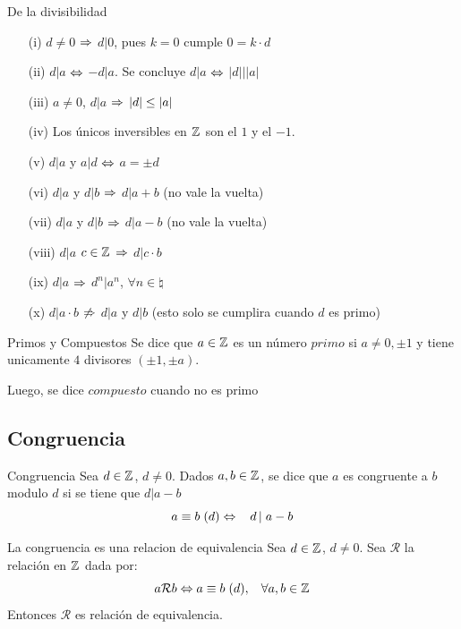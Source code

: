 \documentclass[10pt]{article}
\begin{document}
\begin{prop}{De la divisibilidad} 
\begin{itemize}
 \item[   (i)] $d \neq 0$ $\Rightarrow$ $d | 0$, pues $k = 0$ cumple $0 = k \cdot d$
 \item[  (ii)] $d | a$ $\Leftrightarrow$ $- d | a$. Se concluye $d | a$ $\Leftrightarrow$ 
 $|d| \left\vert \right. |a|$ 
 \item[ (iii)] $a \neq 0$, $d|a$ $\Rightarrow$ $|d| \leq |a|$
 \item[  (iv)] Los únicos inversibles en $\mathbb{Z}^{}$ son el $1$ y el $-1$.
 \item[   (v)] $d|a$ y $a|d$ $\Leftrightarrow$ $a = \pm d$
 \item[  (vi)] $d|a$ y $d|b$ $\Rightarrow$ $d|a+b$ (no vale la vuelta)
 \item[ (vii)] $d|a$ y $d|b$ $\Rightarrow$ $d|a-b$ (no vale la vuelta)
 \item[(viii)] $d|a$ $c \in \mathbb{Z}^{}$ $\Rightarrow$ $d|c \cdot b$
 \item[  (ix)] $d|a$ $\Rightarrow$ $d^n|a^n$, $\forall n \in \natural{}$
 \item[   (x)] $d|a\cdot b$ $\not\Rightarrow$ $d|a$ y $d| b$ (esto solo se cumplira cuando $d$ es primo) 
\end{itemize}
\end{prop}

\begin{defi}{Primos y Compuestos}
 Se dice que $a \in \mathbb{Z}^{}$ es un número $primo$ si $a \neq 0, \pm 1$ y tiene unicamente $4$ divisores $(\pm 1 , \pm a)$.
 
 Luego, se dice $compuesto$ cuando no es primo
\end{defi}

\begin{center}
\subsection{Congruencia} 
\end{center}


\begin{defi}{Congruencia}
 Sea $d \in \mathbb{Z}^{}$, $d \neq 0$. Dados $a,b \in \mathbb{Z}^{}$, se dice que $a$ es congruente a $b$ modulo $d$ si se tiene que $d | a - b$
 \[a \equiv b \hspace{0.1cm} (d) \Leftrightarrow \hspace{0.3cm}  d\left\vert\right.a - b \]
\end{defi}

\begin{propo}{La congruencia es una relacion de equivalencia}
 Sea $d \in \mathbb{Z}^{}$, $d \neq 0$. Sea $\mathcal{R}$ la relación en $\mathbb{Z}^{}$ dada por:
 \[a \mathcal{R} b \Leftrightarrow a \equiv b \hspace{0.1cm} (d) ,\hspace{0.3cm}\forall a,b \in \mathbb{Z}^{}\]
Entonces $\mathcal{R}$ es relación de equivalencia.
 \end{propo}
\end{document}
